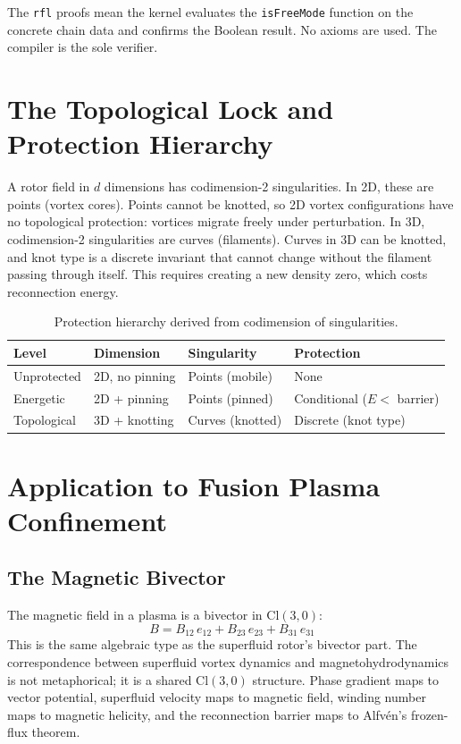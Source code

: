 \documentclass[11pt,a4paper]{article}
\newcommand{\Cl}[1]{\mathrm{Cl}(#1)}
\newcommand{\eonetwo}{e_{12}}
\newcommand{\etwothree}{e_{23}}
\newcommand{\ethreeone}{e_{31}}
\begin{document}
The \texttt{rfl} proofs mean the kernel evaluates the \texttt{isFreeMode} function on the concrete chain data and confirms the Boolean result. No axioms are used. The compiler is the sole verifier.

\section{The Topological Lock and Protection Hierarchy}

A rotor field in $d$ dimensions has codimension-2 singularities. In 2D, these are points (vortex cores). Points cannot be knotted, so 2D vortex configurations have no topological protection: vortices migrate freely under perturbation. In 3D, codimension-2 singularities are curves (filaments). Curves in 3D can be knotted, and knot type is a discrete invariant that cannot change without the filament passing through itself. This requires creating a new density zero, which costs reconnection energy.

\begin{table}[h]
\centering
\begin{tabular}{llll}
\toprule
\textbf{Level} & \textbf{Dimension} & \textbf{Singularity} & \textbf{Protection} \\
\midrule
Unprotected & 2D, no pinning & Points (mobile) & None \\
Energetic & 2D + pinning & Points (pinned) & Conditional ($E < $ barrier) \\
Topological & 3D + knotting & Curves (knotted) & Discrete (knot type) \\
\bottomrule
\end{tabular}
\caption{Protection hierarchy derived from codimension of singularities.}
\label{tab:protection}
\end{table}

\section{Application to Fusion Plasma Confinement}

\subsection{The Magnetic Bivector}

The magnetic field in a plasma is a bivector in $\Cl{3,0}$:
\begin{equation}
B = B_{12}\,\eonetwo + B_{23}\,\etwothree + B_{31}\,\ethreeone
\end{equation}
This is the same algebraic type as the superfluid rotor's bivector part. The correspondence between superfluid vortex dynamics and magnetohydrodynamics is not metaphorical; it is a shared $\Cl{3,0}$ structure. Phase gradient maps to vector potential, superfluid velocity maps to magnetic field, winding number maps to magnetic helicity, and the reconnection barrier maps to Alfv\'en's frozen-flux theorem.
\end{document}
